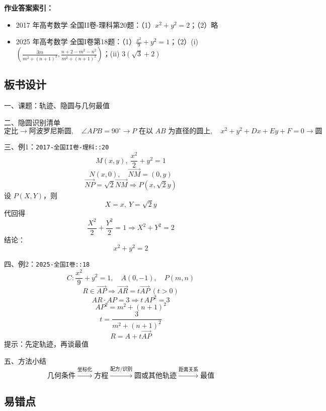 \documentclass[UTF8,a4paper,11pt]{ctexart}
\begin{document}
\noindent\textbf{作业答案索引：}

\begin{itemize}

\item 2017 年高考数学 全国II卷-理科第20题：（1）$x^2+y^2=2$；（2）略

\item 2025 年高考数学 全国I卷第18题：（1）$\frac{x^2}{9} + y^2 = 1$；（2）(i) $\left( \frac{3m}{m^2+(n+1)^2}, \frac{n+2 - m^2 - n^2}{m^2+(n+1)^2} \right)$；(ii) $3(\sqrt{3}+2)$

\end{itemize}

\subsection*{板书设计}

一、课题：轨迹、隐圆与几何最值

二、隐圆识别清单
\[
\text{定比}\to\text{阿波罗尼斯圆},\quad
\angle APB=90^\circ\to P\text{ 在以 }AB\text{ 为直径的圆上},\quad
x^2+y^2+Dx+Ey+F=0\to\text{圆}
\]

三、例1：\texttt{2017-全国II卷-理科::20}
\[
M(x,y),\ \frac{x^2}{2}+y^2=1
\]
\[
N(x,0),\quad \overrightarrow{NM}=(0,y)
\]
\[
\overrightarrow{NP}=\sqrt{2}\overrightarrow{NM}\Rightarrow P(x,\sqrt{2}y)
\]
设 $P(X,Y)$，则
\[
X=x,\ Y=\sqrt{2}y
\]
代回得
\[
\frac{X^2}{2}+\frac{Y^2}{2}=1\Rightarrow X^2+Y^2=2
\]
结论：
\[
\boxed{x^2+y^2=2}
\]

四、例2：\texttt{2025-全国I卷::18}
\[
C:\frac{x^2}{9}+y^2=1,\quad A(0,-1),\quad P(m,n)
\]
\[
R\in \overrightarrow{AP}\Rightarrow \overrightarrow{AR}=t\overrightarrow{AP}\ (t>0)
\]
\[
AR\cdot AP=3\Rightarrow t\,AP^2=3
\]
\[
AP^2=m^2+(n+1)^2
\]
\[
t=\frac{3}{m^2+(n+1)^2}
\]
\[
R=A+t\overrightarrow{AP}
\]
提示：先定轨迹，再谈最值

五、方法小结
\[
\text{几何条件}\xrightarrow{\text{坐标化}}\text{方程}\xrightarrow{\text{配方/识别}}\text{圆或其他轨迹}\xrightarrow{\text{距离关系}}\text{最值}
\]

\subsection*{易错点}
\end{document}
